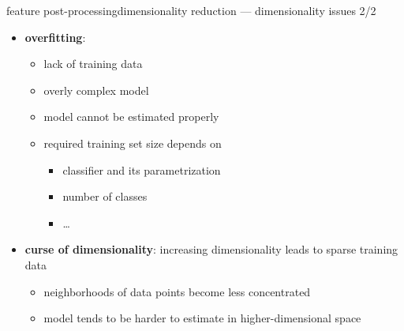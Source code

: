 		\begin{frame}{feature post-processing}{dimensionality reduction --- dimensionality issues 2/2}
            \begin{itemize}
                \item   \textbf{overfitting}:
                    \begin{itemize}
                        \item   lack of training data
                        \item   overly complex model
                        \item[$\Rightarrow$]<2-> model cannot be estimated properly
                    \end{itemize}
                    
                    \bigskip
                    \begin{itemize}
                        \item<3-> required training set size depends on 
                            \begin{itemize}
                                \item   classifier and its parametrization
                                \item   number of classes
                                \item   \ldots
                            \end{itemize}
                    \end{itemize}
                \bigskip\item<5-> \textbf{curse of dimensionality}: increasing dimensionality leads to sparse training data
                    \begin{itemize}
                        \item   neighborhoods of data points become less concentrated
                        \item   model tends to be harder to estimate in higher-dimensional space

\end{itemize}
\end{itemize}
\end{frame}
